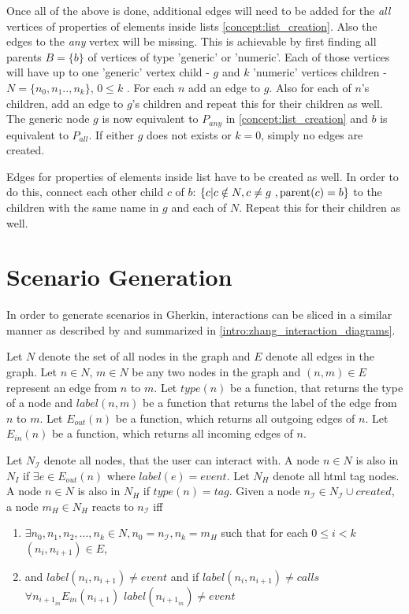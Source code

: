 Once all of the above is done, additional edges will need to be added for the \textit{all} vertices of properties of elements inside lists \ref{concept:list_creation}. Also the edges to the \textit{any} vertex will be missing. This is achievable by first finding all parents $B = \{b\}$ of  vertices of type 'generic' or 'numeric'. Each of those vertices will have up to one 'generic' vertex child - $g$ and $k$
'numeric' vertices children - $N= \{n_0,n_1..,n_k\}$, $0 \leq k$ .
For each $n$ add an edge to $g$. Also for each of $n$'s children, add an edge to $g$'s children and repeat this for their children as well. The generic node $g$ is now equivalent to $P_{any}$ in \ref{concept:list_creation} and $b$ is equivalent to $P_{all}$. If either $g$ does not exists or $k = 0$, simply no edges are created. 

Edges for properties of elements inside list have to be created as well. In order to do this, connect each other child $c$ of $b$:  $\{c| c \notin N, c \neq g\ ,\textmd{parent}(c) = b\}$ to the children with the same name in $g$ and each of $N$. Repeat this for their children as well.

\section{Scenario Generation}
\label{concept:scenario_generation}
In order to generate scenarios in Gherkin, interactions can be sliced in a similar manner as described by \textcite{zhang2019scenario} and summarized in \ref{intro:zhang_interaction_diagrams}.

Let $N$ denote the set of all nodes in the graph and $E$ denote all edges in the graph. Let $n \in N$, $m \in N$ be any two nodes in the graph and $(n, m) \in E $ represent an edge from $n$ to $m$. Let $type(n)$ be a function, that returns the type of a node and $label(n, m)$ be a function that returns the label of the edge from $n$ to $m$. Let $E_{out}(n)$ be a function, which returns all outgoing edges of $n$.
Let $E_{in}(n)$ be a function, which returns all incoming edges of $n$.

Let $N_\mathcal{I}$ denote all nodes, that the user can interact with. A node $n \in N$ is also in $N_I$ if $\exists e \in E_{out}(n)$ where $label(e) = event$. Let $N_H$ denote all html tag nodes. A node $n \in N$ is also in $N_H$ if $type(n) = tag$. 
Given a node $n_\mathcal{I} \in N_\mathcal{I} \cup {created}$, a node $m_H \in N_H$ reacts to $n_\mathcal{I}$ iff
\begin{enumerate}
    \item $\exists n_0,n_1,n_2, \ldots,n_k \in N, n_0=n_\mathcal{I},n_k=m_H$ such that for each $0 \leq i < k  $ $(n_i,n_{i+1}) \in E$,
    \item and $label(n_i,n_{i+1})\neq event$ and if $label(n_i,n_{i+1}) \neq calls$ $\forall n_{{i+1}_{in}} E_{in}(n_{i+1})$ $label(n_{{i+1}_{in}}) \neq event$ 
\end{enumerate}

